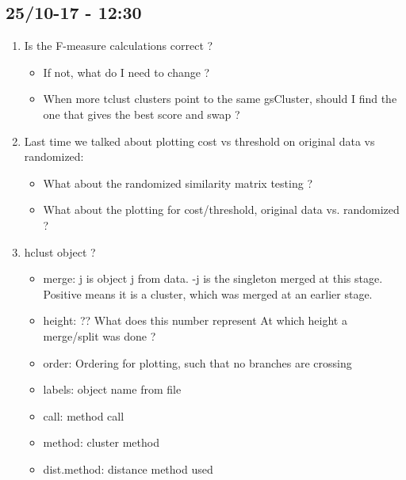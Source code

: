 \documentclass[a4paper,10pt]{article}
\begin{document}
\subsection{25/10-17 - 12:30}

\begin{enumerate}
	\item Is the F-measure calculations correct ?
	\begin{itemize}
		\item If not, what do I need to change ?
		
		\item When more tclust clusters point to the same gsCluster, should I find the one 
		that gives the best score and swap ?
	\end{itemize}
	
	\item Last time we talked about plotting cost vs threshold on original data vs randomized:
	\begin{itemize}
		\item What about the randomized similarity matrix testing ?
		\item What about the plotting for cost/threshold, original data vs. randomized ?
	\end{itemize}
	
	\item hclust object ?
	\begin{itemize}
		\item merge: j is object j from data. -j is the singleton merged at this stage. Positive means it is a cluster, which was merged at an earlier stage.
		
		\item height: ?? What does this number represent
		At which height a merge/split was done ?
		
		\item order: Ordering for plotting, such that no branches are crossing
		
		\item labels: object name from file
		
		\item call: method call
		
		\item method: cluster method
		
		\item dist.method: distance method used
	\end{itemize}
	
\end{enumerate}
\end{document}
